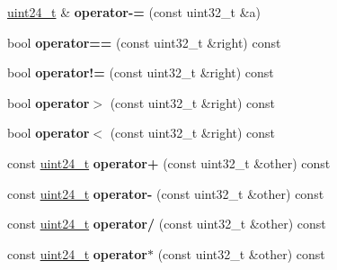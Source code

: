 \begin{DoxyCompactItemize}
\item 
\hypertarget{struct_rak_net_1_1uint24__t_a7d48e647d3db39e77df743093babe924}{\hyperlink{struct_rak_net_1_1uint24__t}{uint24\-\_\-t} \& {\bfseries operator-\/=} (const uint32\-\_\-t \&a)}\label{struct_rak_net_1_1uint24__t_a7d48e647d3db39e77df743093babe924}

\item 
\hypertarget{struct_rak_net_1_1uint24__t_a9765a2966720fdd23111f9d536bb23fd}{bool {\bfseries operator==} (const uint32\-\_\-t \&right) const }\label{struct_rak_net_1_1uint24__t_a9765a2966720fdd23111f9d536bb23fd}

\item 
\hypertarget{struct_rak_net_1_1uint24__t_a3e3fe0ae941b799e856f4fa596b0dc4d}{bool {\bfseries operator!=} (const uint32\-\_\-t \&right) const }\label{struct_rak_net_1_1uint24__t_a3e3fe0ae941b799e856f4fa596b0dc4d}

\item 
\hypertarget{struct_rak_net_1_1uint24__t_a6d350affdab15f3e1d404a6fe3784c3d}{bool {\bfseries operator$>$} (const uint32\-\_\-t \&right) const }\label{struct_rak_net_1_1uint24__t_a6d350affdab15f3e1d404a6fe3784c3d}

\item 
\hypertarget{struct_rak_net_1_1uint24__t_a2543e19136b93b70eee579caa552029f}{bool {\bfseries operator$<$} (const uint32\-\_\-t \&right) const }\label{struct_rak_net_1_1uint24__t_a2543e19136b93b70eee579caa552029f}

\item 
\hypertarget{struct_rak_net_1_1uint24__t_a4e870a42358cdc48a60ed8a0b26d0845}{const \hyperlink{struct_rak_net_1_1uint24__t}{uint24\-\_\-t} {\bfseries operator+} (const uint32\-\_\-t \&other) const }\label{struct_rak_net_1_1uint24__t_a4e870a42358cdc48a60ed8a0b26d0845}

\item 
\hypertarget{struct_rak_net_1_1uint24__t_accf1917fb988b3ffe8763f9d055333cd}{const \hyperlink{struct_rak_net_1_1uint24__t}{uint24\-\_\-t} {\bfseries operator-\/} (const uint32\-\_\-t \&other) const }\label{struct_rak_net_1_1uint24__t_accf1917fb988b3ffe8763f9d055333cd}

\item 
\hypertarget{struct_rak_net_1_1uint24__t_adcff4c319ed97cc368613398a1f35849}{const \hyperlink{struct_rak_net_1_1uint24__t}{uint24\-\_\-t} {\bfseries operator/} (const uint32\-\_\-t \&other) const }\label{struct_rak_net_1_1uint24__t_adcff4c319ed97cc368613398a1f35849}

\item 
\hypertarget{struct_rak_net_1_1uint24__t_a78eb6772b6d2e1976b5103355b5d2a95}{const \hyperlink{struct_rak_net_1_1uint24__t}{uint24\-\_\-t} {\bfseries operator$\ast$} (const uint32\-\_\-t \&other) const }\label{struct_rak_net_1_1uint24__t_a78eb6772b6d2e1976b5103355b5d2a95}

\end{DoxyCompactItemize}

